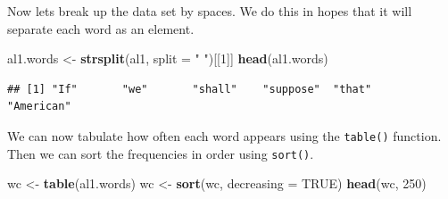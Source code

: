 \documentclass[
]{book}
\newenvironment{Shaded}{\begin{snugshade}}{\end{snugshade}}
\newcommand{\DataTypeTok}[1]{\textcolor[rgb]{0.13,0.29,0.53}{#1}}
\newcommand{\DecValTok}[1]{\textcolor[rgb]{0.00,0.00,0.81}{#1}}
\newcommand{\KeywordTok}[1]{\textcolor[rgb]{0.13,0.29,0.53}{\textbf{#1}}}
\newcommand{\NormalTok}[1]{#1}
\newcommand{\OtherTok}[1]{\textcolor[rgb]{0.56,0.35,0.01}{#1}}
\newcommand{\StringTok}[1]{\textcolor[rgb]{0.31,0.60,0.02}{#1}}
\begin{document}
Now lets break up the data set by spaces. We do this in hopes that it will separate each word as an element.

\begin{Shaded}
\begin{Highlighting}[]
\NormalTok{al1.words <-}\StringTok{ }\KeywordTok{strsplit}\NormalTok{(al1,}
    \DataTypeTok{split =} \StringTok{" "}\NormalTok{)[[}\DecValTok{1}\NormalTok{]]}
\KeywordTok{head}\NormalTok{(al1.words)}
\end{Highlighting}
\end{Shaded}

\begin{verbatim}
## [1] "If"       "we"       "shall"    "suppose"  "that"     "American"
\end{verbatim}

We can now tabulate how often each word appears using the \texttt{table()} function. Then we can sort the frequencies in order using \texttt{sort()}.

\begin{Shaded}
\begin{Highlighting}[]
\NormalTok{wc <-}\StringTok{ }\KeywordTok{table}\NormalTok{(al1.words)}
\NormalTok{wc <-}\StringTok{ }\KeywordTok{sort}\NormalTok{(wc, }\DataTypeTok{decreasing =} \OtherTok{TRUE}\NormalTok{)}
\KeywordTok{head}\NormalTok{(wc, }\DecValTok{250}\NormalTok{)}
\end{Highlighting}
\end{Shaded}
\end{document}
